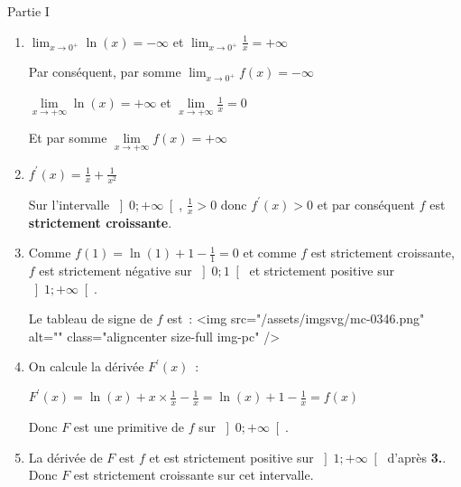 \begin{corrige}
     \begin{h3} Partie I \end{h3}
     \begin{enumerate}
          \item
          $\lim_{x\rightarrow 0^+} \ln\left(x\right)=-\infty   $  et  $ \lim_{x\rightarrow 0^+} \frac{1}{x}=+\infty $
          \par
          Par conséquent, par somme $\lim_{x\rightarrow 0^+} f\left(x\right)=-\infty $
          \par
          $\lim\limits_{x\rightarrow +\infty } \ln\left(x\right)=+\infty   $ et $ \lim\limits_{x\rightarrow +\infty } \frac{1}{x}=0$
          \par
          Et par somme $\lim\limits_{x\rightarrow +\infty }f\left(x\right)=+\infty $
          \item
          $f^{\prime}\left(x\right)= \frac{1}{x}+\frac{1}{x^{2}}$
          \par
          Sur l'intervalle $\left]0;+\infty \right[$, $\frac{1}{x} > 0$ donc $f^{\prime}\left(x\right) > 0$ et par conséquent $f$ est \textbf{strictement croissante}.
          \item
          Comme $f\left(1\right)=\ln\left(1\right)+1-\frac{1}{1}=0$ et comme $f$ est strictement croissante, $f$ est strictement négative sur $\left]0;1\right[$ et strictement positive sur $\left]1 ;+\infty \right[$.
          \par
          Le tableau de signe de $f$ est :
          <img src="/assets/imgsvg/mc-0346.png" alt="" class="aligncenter size-full  img-pc" />
          \item
          On calcule la dérivée $F^{\prime}\left(x\right)$ :
          \par
          $F^{\prime}\left(x\right)=\ln\left(x\right)+x\times \frac{1}{x}-\frac{1}{x}=\ln\left(x\right)+1-\frac{1}{x}=f\left(x\right)$
          \par
          Donc $F$ est une primitive de $f$ sur $\left]0;+\infty \right[$.
          \item
          La dérivée de $F$ est $f$ et est strictement positive sur $\left]1;+\infty \right[$ d'après \textbf{3.}. Donc $F$ est strictement croissante sur cet intervalle.

\end{enumerate}
\end{corrige}
